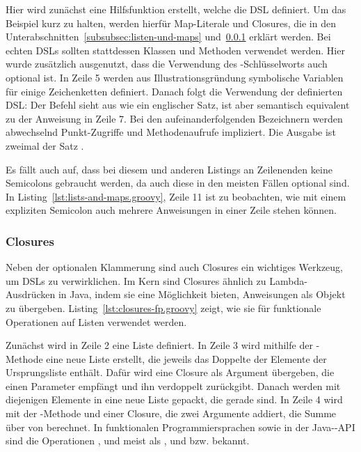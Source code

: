 Hier wird zunächst eine Hilfsfunktion  erstellt, welche die DSL definiert.
Um das Beispiel kurz zu halten, werden hierfür Map-Literale und Closures, die in den Unterabschnitten~\ref{subsubsec:listen-und-maps} und~\ref{subsubsec:closures} erklärt werden.
Bei echten DSLs sollten stattdessen Klassen und Methoden verwendet werden.
Hier wurde zusätzlich ausgenutzt, dass die Verwendung des -Schlüsselworts auch optional ist.
In Zeile 5 werden aus Illustrationsgründung symbolische Variablen für einige Zeichenketten definiert.
Danach folgt die Verwendung der definierten DSL:
Der Befehl sieht aus wie ein englischer Satz, ist aber semantisch equivalent zu der Anweisung in Zeile 7.
Bei den aufeinanderfolgenden Bezeichnern werden abwechselnd Punkt-Zugriffe und Methodenaufrufe impliziert.
Die Ausgabe ist zweimal der Satz .

Es fällt auch auf, dass bei diesem und anderen Listings an Zeilenenden keine Semicolons gebraucht werden, da auch diese in den meisten Fällen optional sind.
In Listing~\ref{lst:lists-and-maps.groovy}, Zeile 11 ist zu beobachten, wie mit einem expliziten Semicolon auch mehrere Anweisungen in einer Zeile stehen können.

\subsubsection{Closures}\label{subsubsec:closures}

Neben der optionalen Klammerung sind auch Closures ein wichtiges Werkzeug, um DSLs zu verwirklichen.
Im Kern sind Closures ähnlich zu Lambda-Ausdrücken in Java, indem sie eine Möglichkeit bieten, Anweisungen als Objekt zu übergeben.
Listing~\ref{lst:closures-fp.groovy} zeigt, wie sie für funktionale Operationen auf Listen verwendet werden.


Zunächst wird in Zeile 2 eine Liste definiert.
In Zeile 3 wird mithilfe der -Methode eine neue Liste erstellt, die jeweils das Doppelte der Elemente der Ursprungsliste enthält.
Dafür wird eine Closure als Argument übergeben, die einen Parameter  empfängt und ihn verdoppelt zurückgibt.
Danach werden mit  diejenigen Elemente in eine neue Liste gepackt, die gerade sind.
In Zeile 4 wird mit der -Methode und einer Closure, die zwei Argumente addiert, die Summe über von  berechnet.
In funktionalen Programmiersprachen sowie in der Java--API sind die Operationen ,  und  meist als ,  und  bzw.  bekannt.

